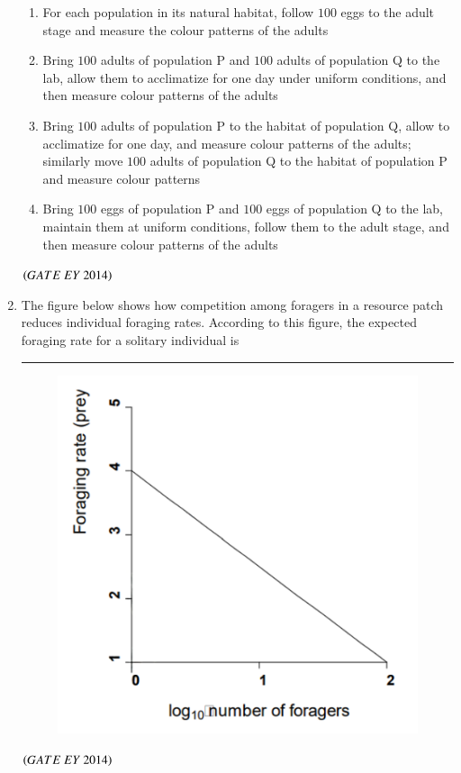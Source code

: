 \documentclass[journal]{IEEEtran}
\numberwithin{equation}{enumi}
\numberwithin{figure}{enumi}
\begin{document}
\begin{enumerate}
\begin{enumerate}
        \item For each population in its natural habitat, follow $100$ eggs to the adult stage and measure the colour patterns of the adults
        \item Bring $100$ adults of population P and $100$ adults of population Q to the lab, allow them to acclimatize for one day under uniform conditions, and then measure colour patterns of the adults
        \item Bring $100$ adults of population P to the habitat of population Q, allow to acclimatize for one day, and measure colour patterns of the adults; similarly move $100$ adults of population Q to the habitat of population P and measure colour patterns
        \item Bring $100$ eggs of population P and $100$ eggs of population Q to the lab, maintain them at uniform conditions, follow them to the adult stage, and then measure colour patterns of the adults
    \end{enumerate}
    \hfill{$\brak{ GATE\ EY\ 2014}$}
    \bigskip
    
   
      \item The figure below shows how competition among foragers in a resource patch reduces individual foraging rates. According to this figure, the expected foraging rate for a solitary individual is \rule{3cm}{0.15mm}
    \begin{figure}[H]
    \centering
    \includegraphics[width=0.6\columnwidth]{figs/9.png}
    \caption{}
    \label{fig:9}
   \end{figure}
    \hfill{$\brak{ GATE\ EY\ 2014}$}
    \bigskip
    

\end{enumerate}
\end{document}
